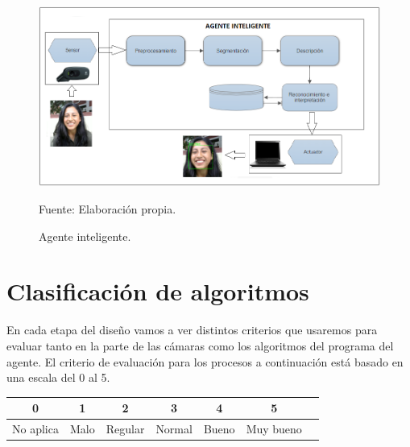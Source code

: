 \begin{figure}[ht]
\begin{center}
\includegraphics[width=1\textwidth]{Imagen26}
\end{center}
\begin{center}
\vskip -0.5cm
\caption{\small{Agente inteligente.}}
{\small{Fuente: Elaboración propia.}}
\end{center}
\end{figure}

\vskip 3cm

\section{Clasificación de algoritmos}
En cada etapa del diseño vamos a ver distintos criterios que usaremos para evaluar tanto en la parte de las cámaras como los algoritmos del programa del agente. El criterio de evaluación para los procesos a continuación está basado en una escala del 0
al 5.

\begin{table}[ht!]
\centering
\begin{tabular}{|c|c|c|c|c|c|c|} \hline
\bf 0 & \bf 1 & \bf 2 & \bf 3 & \bf 4 & \bf 5 \\ \hline
No aplica & Malo & Regular & Normal & Bueno & Muy bueno \\ \hline 
\end{tabular}
\end{table}

\vskip 3cm

